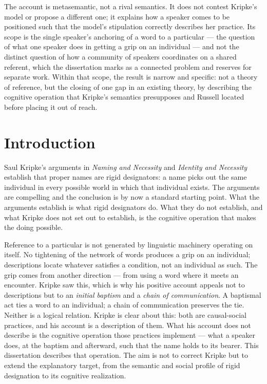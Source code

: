\documentclass[12pt,a4paper]{article}
\begin{document}
The account is metasemantic, not a rival semantics. It does not contest Kripke's model or propose a different one; it explains how a speaker comes to be positioned such that the model's stipulation correctly describes her practice. Its scope is the single speaker's anchoring of a word to a particular --- the question of what one speaker does in getting a grip on an individual --- and not the distinct question of how a community of speakers coordinates on a shared referent, which the dissertation marks as a connected problem and reserves for separate work. Within that scope, the result is narrow and specific: not a theory of reference, but the closing of one gap in an existing theory, by describing the cognitive operation that Kripke's semantics presupposes and Russell located before placing it out of reach.

\section{Introduction}\label{introduction}

Saul Kripke's arguments in \emph{Naming and Necessity} and \emph{Identity and Necessity} establish that proper names are rigid designators: a name picks out the same individual in every possible world in which that individual exists. The arguments are compelling and the conclusion is by now a standard starting point. What the arguments establish is what rigid designators do. What they do not establish, and what Kripke does not set out to establish, is the cognitive operation that makes the doing possible.

Reference to a particular is not generated by linguistic machinery operating on itself. No tightening of the network of words produces a grip on an individual; descriptions locate whatever satisfies a condition, not an individual as such. The grip comes from another direction --- from using a word where it meets an encounter. Kripke saw this, which is why his positive account appeals not to descriptions but to an \emph{initial baptism} and a \emph{chain of communication}. A baptismal act ties a word to an individual; a chain of communication preserves the tie. Neither is a logical relation. Kripke is clear about this: both are causal-social practices, and his account is a description of them. What his account does not describe is the cognitive operation those practices implement --- what a speaker does, at the baptism and afterward, such that the name holds to its bearer. This dissertation describes that operation. The aim is not to correct Kripke but to extend the explanatory target, from the semantic and social profile of rigid designation to its cognitive realization.
\end{document}
